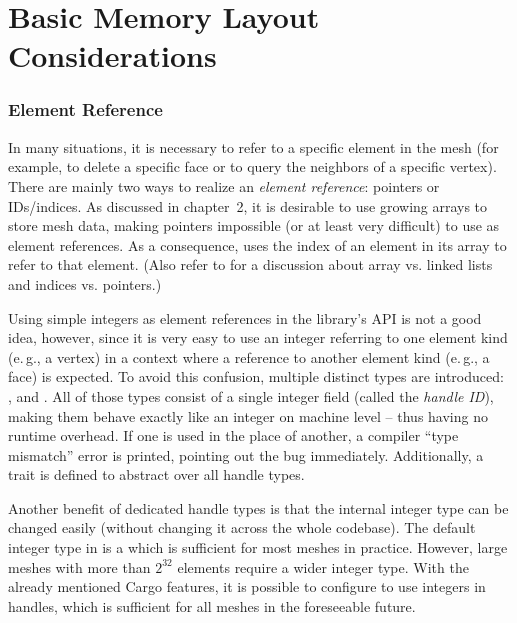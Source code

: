 \section{Basic Memory Layout Considerations}
\label{chap:memory-layout}

\subsubsection*{Element Reference}

In many situations, it is necessary to refer to a specific element in the mesh (for example, to delete a specific face or to query the neighbors of a specific vertex).
There are mainly two ways to realize an \emph{element reference}: pointers or IDs/indices.
As discussed in chapter~2, it is desirable to use growing arrays to store mesh data, making pointers impossible (or at least very difficult) to use as element references.
As a consequence,  uses the index of an element in its array to refer to that element.
(Also refer to \cite{sieger2011design} for a discussion about array vs. linked lists and indices vs. pointers.)

Using simple integers as element references in the library's API is not a good idea, however, since it is very easy to use an integer referring to one element kind (e.\,g., a vertex) in a context where a reference to another element kind (e.\,g., a face) is expected.
To avoid this confusion, multiple distinct types are introduced: ,  and .
All of those types consist of a single integer field (called the \emph{handle ID}), making them behave exactly like an integer on machine level -- thus having no runtime overhead.
If one is used in the place of another, a compiler \enquote{type mismatch} error is printed, pointing out the bug immediately.
Additionally, a  trait is defined to abstract over all handle types.

Another benefit of dedicated handle types is that the internal integer type can be changed easily (without changing it across the whole codebase).
The default integer type in  is a  which is sufficient for most meshes in practice.
However, large meshes with more than $2^{32}$ elements require a wider integer type.
With the already mentioned Cargo features, it is possible to configure  to use  integers in handles, which is sufficient for all meshes in the foreseeable future.

\vspace{2cm}

